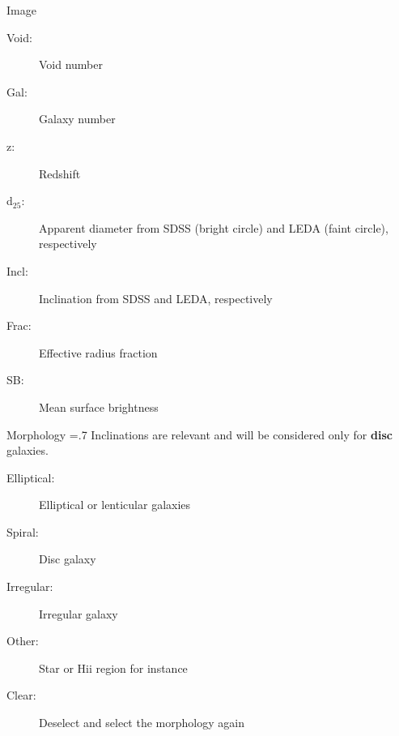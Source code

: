 \documentclass[final]{beamer}
\newlength{\onecolwid}
\newlength{\twocolwid}
\begin{document}
\begin{frame}[t]
\begin{columns}[t]
\begin{column}{\onecolwid}
\begin{block}{Image}
		\begin{description}
			\item[Void:] Void number
			\item[Gal:] Galaxy number
			\item[z:] Redshift
			\item[d$_{25}$:] Apparent diameter from SDSS (bright circle) and LEDA (faint circle), respectively
			\item[Incl:] Inclination from SDSS and LEDA, respectively
			\item[Frac:] Effective radius fraction
			\item[SB:] Mean surface brightness
		\end{description}
	\end{block}
        \begin{block}{Morphology}
        \baselineskip=.7\baselineskip
Inclinations are relevant and will be considered only for {\bf disc} galaxies.
		\begin{description}
			\item[Elliptical:] Elliptical or lenticular galaxies
			\item[Spiral:] Disc galaxy
			\item[Irregular:] Irregular galaxy
			\item[Other:] Star or H{\sc ii} region for instance
			\item[Clear:] Deselect and select the morphology again
		\end{description}

        \end{block}
    \end{column}



\end{columns}
\end{frame}
\end{document}
